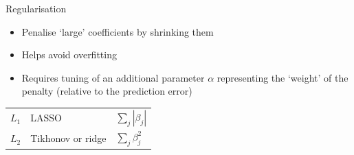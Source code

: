 \begin{frame}{Regularisation}
        \begin{itemize}
        \item Penalise `large' coefficients by shrinking them
        \item Helps avoid overfitting
        \item Requires \alert{tuning} of an additional parameter $\alpha$
              representing the `weight' of the penalty (relative to the
              prediction error)
    \end{itemize}
    \vfill
    \begin{center}
        \renewcommand*{\arraystretch}{1.5}
        \begin{tabular}{lll}
            \toprule
            $L_{1}$ & LASSO & $\sum_{j} | \beta_{j} |$ \\
            $L_{2}$ & Tikhonov or ridge & $\sum_{j} \beta_{j}^{2}$ \\
            \bottomrule
        \end{tabular}
    \end{center}
\end{frame}



